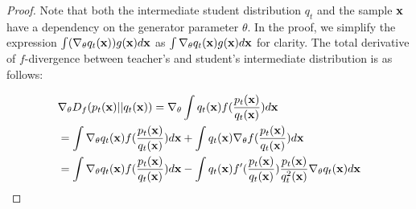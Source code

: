 \begin{proof}

Note that both the intermediate student distribution $q_t$ and the sample ${\mathbf{x}}$ have a dependency on the generator parameter $\theta$. In the proof, we simplify the expression $\int (\nabla_\theta  q_t({\mathbf{x}})) g({\mathbf{x}}) d{\mathbf{x}}$ as $\int \nabla_\theta  q_t({\mathbf{x}}) g({\mathbf{x}}) d{\mathbf{x}}$ for clarity. The total derivative of $f$-divergence between teacher's and student's intermediate distribution is as follows: 


\begin{align*}
&\nabla_\theta D_f(p_t(\rvx)||q_t(\rvx)) =   \nabla_\theta \int q_t(\rvx) f(\frac{p_t(\rvx)}{q_t(\rvx)}) d\rvx \\
&=   \int \nabla_\theta q_t(\rvx) f(\frac{p_t(\rvx)}{q_t(\rvx)}) d\rvx + \int  q_t(\rvx) \nabla_\theta f(\frac{p_t(\rvx)}{q_t(\rvx)}) d\rvx \\
&=  \int \nabla_\theta q_t(\rvx) f(\frac{p_t(\rvx)}{q_t(\rvx)}) d\rvx - \int  q_t(\rvx)  f'(\frac{p_t(\rvx)}{q_t(\rvx)})\frac{p_t(\rvx)}{q^2_t(\rvx)} \nabla_\theta q_t(\rvx)d\rvx\\

\end{align*}
\end{proof}
